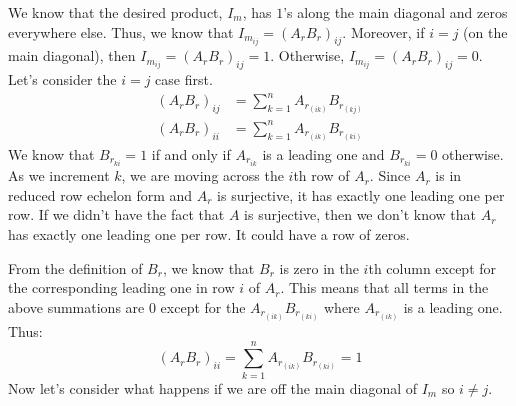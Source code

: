 We know that the desired product, $I_m$, has $1$'s along the main diagonal and zeros everywhere else. Thus, we know that $I_{m_{ij}}=(A_rB_r)_{ij}$. Moreover, if $i=j$ (on the main diagonal), then $I_{m_{ij}}=(A_rB_r)_{ij}=1$. Otherwise, $I_{m_{ij}}=(A_rB_r)_{ij}=0$. Let's consider the $i=j$ case first.
\begin{align*}
    (A_rB_r)_{ij}&=\sum_{k=1}^n A_{r_{(ik)}}B_{r_{(kj)}}\\
    (A_rB_r)_{ii}&=\sum_{k=1}^n A_{r_{(ik)}}B_{r_{(ki)}}
\end{align*}
We know that $B_{r_{ki}}=1$ if and only if $A_{r_{ik}}$ is a leading one and $B_{r_{ki}}=0$ otherwise. As we increment $k$, we are moving across the $i$th row of $A_r$. Since $A_r$ is in reduced row echelon form and $A_r$ is surjective, it has exactly one leading one per row. If we didn't have the fact that $A$ is surjective, then we don't know that $A_r$ has exactly one leading one per row. It could have a row of zeros.

From the definition of $B_r$, we know that $B_r$ is zero in the $i$th column except for the corresponding leading one in row $i$ of $A_r$. This means that all terms in the above summations are $0$ except for the $A_{r_{(ik)}}B_{r_{(ki)}}$ where $A_{r_{(ik)}}$ is a leading one. Thus:
$$(A_rB_r)_{ii}=\sum_{k=1}^n A_{r_{(ik)}}B_{r_{(ki)}}=1$$
Now let's consider what happens if we are off the main diagonal of $I_m$ so $i\neq j$.
